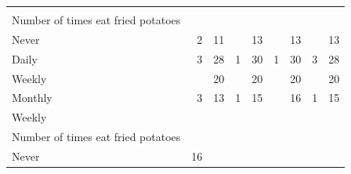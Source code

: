 \documentclass{article}
\begin{document}
\begin{table}[!h]
{\begin{tabular}{lllllllll}
			\multicolumn{1}{r}{} \\
			\multicolumn{1}{l}{\hspace{4em}Number of times eat fried potatoes} &
			\multicolumn{1}{|r}{} &
			\multicolumn{1}{r}{} &
			\multicolumn{1}{r}{} &
			\multicolumn{1}{r}{} &
			\multicolumn{1}{r}{} &
			\multicolumn{1}{r}{} &
			\multicolumn{1}{r}{} &
			\multicolumn{1}{r}{} \\
			\multicolumn{1}{l}{\hspace{5em}Never} &
			\multicolumn{1}{|r}{2} &
			\multicolumn{1}{r}{11} &
			\multicolumn{1}{r}{} &
			\multicolumn{1}{r}{13} &
			\multicolumn{1}{r}{} &
			\multicolumn{1}{r}{13} &
			\multicolumn{1}{r}{} &
			\multicolumn{1}{r}{13} \\
			\multicolumn{1}{l}{\hspace{5em}Daily} &
			\multicolumn{1}{|r}{3} &
			\multicolumn{1}{r}{28} &
			\multicolumn{1}{r}{1} &
			\multicolumn{1}{r}{30} &
			\multicolumn{1}{r}{1} &
			\multicolumn{1}{r}{30} &
			\multicolumn{1}{r}{3} &
			\multicolumn{1}{r}{28} \\
			\multicolumn{1}{l}{\hspace{5em}Weekly} &
			\multicolumn{1}{|r}{} &
			\multicolumn{1}{r}{20} &
			\multicolumn{1}{r}{} &
			\multicolumn{1}{r}{20} &
			\multicolumn{1}{r}{} &
			\multicolumn{1}{r}{20} &
			\multicolumn{1}{r}{} &
			\multicolumn{1}{r}{20} \\
			\multicolumn{1}{l}{\hspace{5em}Monthly} &
			\multicolumn{1}{|r}{3} &
			\multicolumn{1}{r}{13} &
			\multicolumn{1}{r}{1} &
			\multicolumn{1}{r}{15} &
			\multicolumn{1}{r}{} &
			\multicolumn{1}{r}{16} &
			\multicolumn{1}{r}{1} &
			\multicolumn{1}{r}{15} \\
			\multicolumn{1}{l}{\hspace{3em}Weekly} &
			\multicolumn{1}{|r}{} &
			\multicolumn{1}{r}{} &
			\multicolumn{1}{r}{} &
			\multicolumn{1}{r}{} &
			\multicolumn{1}{r}{} &
			\multicolumn{1}{r}{} &
			\multicolumn{1}{r}{} &
			\multicolumn{1}{r}{} \\
			\multicolumn{1}{l}{\hspace{4em}Number of times eat fried potatoes} &
			\multicolumn{1}{|r}{} &
			\multicolumn{1}{r}{} &
			\multicolumn{1}{r}{} &
			\multicolumn{1}{r}{} &
			\multicolumn{1}{r}{} &
			\multicolumn{1}{r}{} &
			\multicolumn{1}{r}{} &
			\multicolumn{1}{r}{} \\
			\multicolumn{1}{l}{\hspace{5em}Never} &
			\multicolumn{1}{|r}{16} &

\end{tabular}}
\end{table}
\end{document}
